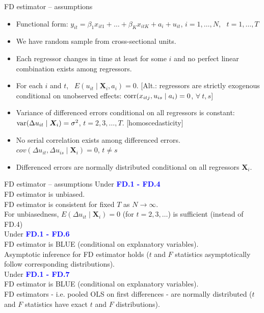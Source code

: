 \documentclass[usenames,dvipsnames]{beamer}
\begin{document}
\begin{frame}{FD estimator – assumptions}
\begin{itemize}
\item[\textbf{FD.1}] Functional form: $y_{it} = \beta_1 x_{it1} + \dots + \beta_K x_{itK} + a_i + u_{it}$, $i = 1, \dots, N$, \ $t = 1, \dots, T$
\item[\textbf{FD.2}] We have random sample from cross-sectional units.
\item[\textbf{FD.3}] Each regressor changes in time at least for some $i$ and no perfect linear combination exists among regressors.
\item[\textbf{FD.4}] For each $i$ and $t$, \ $E (u_{it} \mid \bm{X}_i, a_i) = 0$. [Alt.: regressors are strictly exogenous conditional on unobserved effects: $\textnormal{corr}(x_{itj}, u_{is} \mid a_i)=0$, \quad $\forall \ t, s$]
\item[\textbf{FD.5}] Variance of differenced errors conditional on all regressors is constant: $\textnormal{var}(\Delta u_{it} \mid \bm{X}_i) = \sigma^2$, \quad $t= 2,3, \dots, T$. [homoscedasticity]
\item[\textbf{FD.6}] No serial correlation exists among differenced errors. $\textit{cov}(\Delta u_{it}, \Delta u_{is} \mid \bm{X}_i) = 0$, \quad $t \neq s$
\item[\textbf{FD.7}] Differenced errors are normally distributed conditional on all regressors $\bm{X}_i$.
\end{itemize}
\end{frame}
\begin{frame}{FD estimator – assumptions}
Under  \textcolor{blue}{\textbf{FD.1 - FD.4}}\\
FD estimator is unbiased. \\
FD estimator is consistent for fixed $T$ as $N \rightarrow \infty$.\\
For unbiasedness, $E (\Delta u_{it} \mid \bm{X}_i) = 0$ (for $t = 2,3, \dots$) is sufficient (instead of FD.4)\\
\medskip
Under \textcolor{blue}{\textbf{FD.1 - FD.6}}\\
FD estimator is BLUE (conditional on explanatory variables).\\
Asymptotic inference for FD estimator holds ($t$ and $F$ statistics asymptotically follow corresponding distributions).\\
\medskip
Under  \textcolor{blue}{\textbf{FD.1 - FD.7}}\\
FD estimator is BLUE (conditional on explanatory variables).\\
FD estimators - i.e. pooled OLS on first differences - are normally distributed ($t$ and $F$ statistics have exact $t$ and $F$ distributions).
\end{frame}
\end{document}
